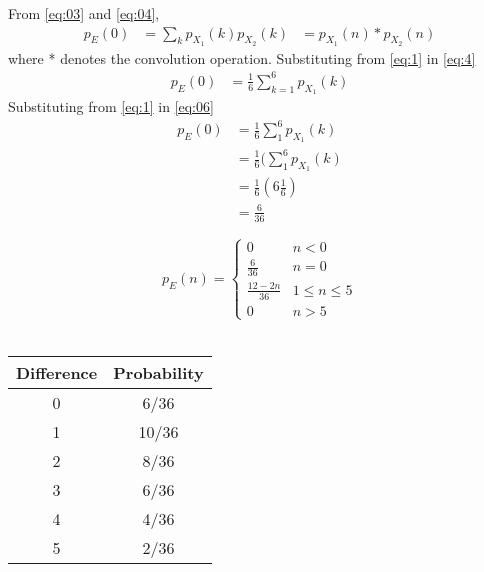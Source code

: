 \documentclass[journal,12pt,twocolumn]{IEEEtran}
\begin{document}
From \eqref{eq:03} and \eqref{eq:04},
\begin{align}
   p_E(0)  &=\sum_{k}p_{X_{1}}(k)p_{X_{2}}(k)
  &= p_{X_{1}}(n)*p_{X_{2}}(n)\label{eq:05}
\end{align}
where * denotes the convolution operation. Substituting from \eqref{eq:1} in \eqref{eq:4}
\begin{align}
   p_E(0)  &=\frac{1}{6}\sum_{k=1}^{6}p_{X_{1}}(k)\label{eq:06}
\end{align}
Substituting from \eqref{eq:1} in \eqref{eq:06}
\begin{align}
   p_E(0)  &=\frac{1}{6}\sum_{1}^{6}p_{X_{1}}(k)\nonumber\\
  &=\frac{1}{6}(\sum_{1}^{6}p_{X_{1}}(k)\nonumber\\
   &=\frac{1}{6}(6\frac{1}{6})\nonumber\\
    &=\frac{6}{36}\nonumber
\end{align}

\begin{equation}
p_{E}(n) =  
\begin{cases}
    0 &  n <  0  \\
    \frac{6}{36} & n=0\\
    \frac{12-2n}{36}& 1\leq  n\leq 5\\
    0 &  n>5
\end{cases}
\label{eq:pmf}
\end{equation}\\
\begin{center}
  \begin{tabular}{| c | c |}
    \hline
    Difference & Probability \\ \hline
    0 & 6/36\\
    1 & 10/36 \\ 
    2 & 8/36 \\ 
    3 & 6/36 \\ 
    4 & 4/36 \\ 
    5 & 2/36 \\  
    \hline
  \end{tabular}
\end{center}


%
\end{document}
